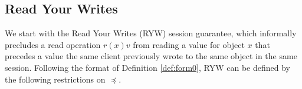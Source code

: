 \documentclass[journal,compsoc]{IEEEtran}
\begin{document}
\subsection{Read Your Writes}

We start with the Read Your Writes (RYW) session guarantee, which informally precludes a read operation $r(x)v$  from reading a value for object $x$ that precedes a value the same client previously wrote to the same object in the same session.
Following the format of Definition \ref{def:form0}, RYW can be defined by the following restrictions on $\preccurlyeq$.
\end{document}
